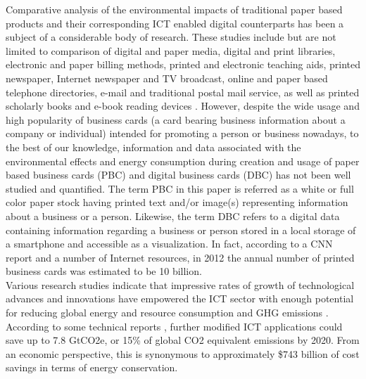 \documentclass[3p,times,procedia]{elsarticle}
\begin{document}
Comparative analysis of the environmental impacts of traditional paper based products and their corresponding ICT enabled digital counterparts has been a subject of a  considerable body of research. These studies include but are not limited to comparison of digital and paper media, digital and print libraries, electronic and paper billing methods, printed and electronic teaching aids, printed newspaper, Internet newspaper and TV broadcast, online and paper based telephone directories, e-mail and traditional postal mail service, as well as printed scholarly books and e-book reading devices \cite{Bull201410, 6360455, enroth2009, zurkirch2000, kozak2003,hischier2003m}. However, despite the wide usage and high popularity of business cards (a card bearing business information about a company or individual) intended for promoting a person or business nowadays, to the best of our knowledge, information and data associated with the environmental effects and energy consumption during creation and usage of paper based business cards (PBC) and digital business cards (DBC) has not been well studied and quantified. The term PBC in this paper is referred as a white or full color paper stock having printed text and/or image(s) representing information about a business or a person. Likewise, the term DBC refers to a digital data containing information regarding a business or person stored in a local storage of a smartphone and accessible as a visualization. In fact, according to a CNN report and a number of Internet resources, in 2012 the annual number of printed business cards was estimated to be 10 billion.\\

Various research studies indicate that impressive rates of growth of technological advances and innovations have empowered the ICT sector with enough potential for reducing global energy and resource consumption and GHG emissions  \cite{10046363,924525, 6360455}. According to some technical reports \cite{s3758490, 7282419}, further modified ICT applications could save up to 7.8 GtCO2e, or 15\% of global CO2 equivalent emissions by 2020. From an economic perspective, this is synonymous to approximately \$743 billion of cost savings in terms of energy conservation.\\
\end{document}
